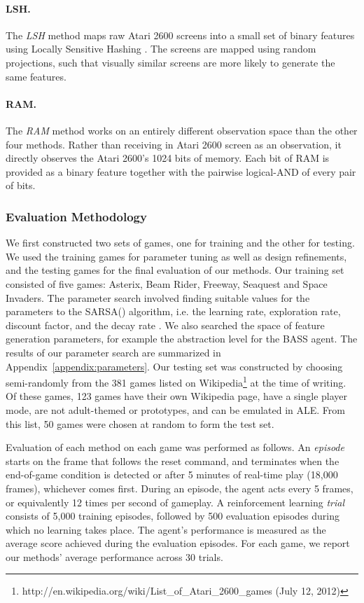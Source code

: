 \documentclass[twoside,11pt]{article}
\newcommand{\gamename}[1]{{\sc #1}}
\begin{document}
\paragraph{LSH.} The \emph{LSH} method maps raw Atari 2600 screens into a small set of binary features
using Locally Sensitive Hashing \cite{gionis_99}. The screens are mapped using random 
projections, such that visually similar screens are more likely to generate the same features.

\paragraph{RAM.} The \emph{RAM} method works on an entirely different observation space than the other four methods.  Rather than receiving in Atari 2600 screen as an observation, it directly observes the Atari 2600's 1024 bits of memory.  
Each bit of RAM is provided as a binary feature together with the pairwise logical-AND of every pair of bits.

\subsubsection{Evaluation Methodology}
\label{sec:RL:experimental_setup}

We first constructed two sets of games, one for training and the other for testing. 
We used the training games for parameter tuning as well as design refinements, and the testing games for the final evaluation of our methods.
Our training set consisted of five games: \gamename{Asterix}, \gamename{Beam Rider}, \gamename{Freeway}, \gamename{Seaquest} and \gamename{Space Invaders}. 
The parameter search involved finding suitable values for the parameters to the SARSA() algorithm, i.e. the learning rate, exploration rate, discount factor, and the decay rate . 
We also searched the space of feature generation parameters, for example the abstraction level for the BASS agent. 
The results of our parameter search are summarized in Appendix~\ref{appendix:parameters}.
Our testing set was constructed by choosing semi-randomly from the 381 games listed on Wikipedia\footnote{http://en.wikipedia.org/wiki/List\_of\_Atari\_2600\_games (July 12, 2012)} at the time of writing. 
Of these games, 123 games have their own Wikipedia page, have a single player mode, are not adult-themed or prototypes, and can be emulated in ALE. From this list,
50 games were chosen at random to form the test set.

Evaluation of each method on each game was performed as follows.
An \emph{episode} starts on the frame that follows the reset command, and terminates when the end-of-game condition is detected or after 5 minutes of real-time play (18,000 frames), whichever comes first. 
During an episode, the agent acts every 5 frames, or equivalently 12 times per second of gameplay. 
A reinforcement learning \emph{trial} consists of 5,000 training episodes, followed by 500 evaluation episodes during which no learning takes place. 
The agent's performance is measured as the average score achieved during the evaluation episodes. 
For each game, we report our methods' average performance across 30 trials. 
\end{document}
